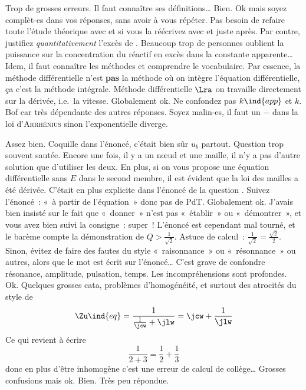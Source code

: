 \documentclass[a4paper, 12pt, final, garamond]{book}
\begin{document}

\setcounter{section}{0}
\begin{enumerate}
	Trop de grosses erreurs. Il faut connaître ses définitions…
	Bien.
	Ok mais soyez complèt-es dans vos réponses, sans avoir à vous répéter. Pas
	besoin de refaire toute l'étude théorique avec \ce{[A]} et \ce{[B]} si vous la
	réécrivez avec \ce{[MH]} et \ce{[O2]} juste après. Par contre, justifiez
	\textit{quantitativement} l'excès de . Beaucoup trop de personnes
	oublient la puissance sur la concentration du réactif en excès dans la
	constante apparente…
	Idem, il faut connaître les méthodes et comprendre le vocabulaire. Par
	essence, la méthode différentielle n'est \textbf{pas} la méthode où on intègre
	l'équation différentielle, ça c'est la méthode intégrale. Méthode
	différentielle $\Lra$ on travaille directement sur la dérivée, i.e.\ la
	vitesse.
	Globalement ok. Ne confondez pas $k\ind{app}$ et $k$.
	Bof car très dépendante des autres réponses.
	Soyez malin-es, il faut un $-$ dans la loi d'\textsc{Arrhénius} sinon
	l'exponentielle diverge.
\end{enumerate}

\begin{enumerate}
	Assez bien.
	Coquille dans l'énoncé, c'était bien sûr $u_b$ partout. Question trop souvent
	sautée. Encore une fois, il y a un nœud et une maille, il n'y a pas d'autre
	solution que d'utiliser les deux. En plus, si on vous propose une équation
	différentielle sans $E$ dans le second membre, il est évident que la loi des
	mailles a été dérivée. C'était en plus explicite dans l'énoncé de la question
	.
	Suivez l'énoncé~: «~à partir de l'équation~» donc pas de PdT. Globalement ok.
	J'avais bien insisté sur le fait que «~donner~» n'est pas «~établir~» ou
	«~démontrer~», et vous avez bien suivi la consigne~: super~! L'énoncé est
	cependant mal tourné, et le barème compte la démonstration de $Q >
		\frac{1}{\sqrt{2}}$.
	\smallbreak
	Astuce de calcul~: $\frac{1}{\sqrt{2}} = \frac{\sqrt{2}}{2}$.
	\smallbreak
	Sinon, évitez de faire des fautes du style «~raisonnance~» ou
	«~résonnance~» ou autres, alors que le mot est écrit sur l'énoncé…
	\smallbreak
	C'est grave de confondre résonance, amplitude, pulsation, temps. Les
	incompréhensions sont profondes.
	Ok.
	Quelques grosses cata, problèmes d'homogénéité, et surtout des atrocités du
	style de
	\[
		\Zu\ind{eq} = \frac{1}{\frac{1}{\jcw}+\jlw} = \jcw + \frac{1}{\jlw}
	\]
	Ce qui revient à écrire
	\[
		\frac{1}{2+3} = \frac{1}{2} + \frac{1}{3}
	\]
	donc en plus d'être inhomogène c'est une erreur de calcul de collège…
	Grosses confusions mais ok.
	Bien.
	Très peu répondue.
\end{enumerate}
\end{document}
